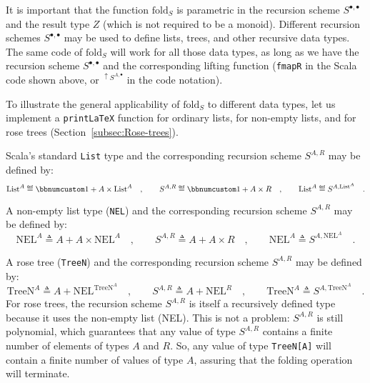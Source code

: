 It is important that the function $\text{fold}_{S}$ is parametric
in the recursion scheme $S^{\bullet,\bullet}$ and the result type
$Z$ (which is not required to be a monoid). Different recursion schemes
$S^{\bullet,\bullet}$ may be used to define lists, trees, and other
recursive data types. The same code of $\text{fold}_{S}$ will work
for all those data types, as long as we have the recursion scheme
$S^{\bullet,\bullet}$ and the corresponding lifting function (\lstinline!fmapR!
in the Scala code shown above, or $^{\uparrow S^{A,\bullet}}$ in
the code notation).

To illustrate the general applicability of $\text{fold}_{S}$ to different
data types, let us implement a \lstinline!printLaTeX! function for
ordinary lists, for non-empty lists, and for rose trees (Section~\ref{subsec:Rose-trees}).

Scala\textsf{'}s standard \lstinline!List! type and the corresponding recursion
scheme $S^{A,R}$ may be defined by:
\[
\text{List}^{A}\triangleq\bbnum 1+A\times\text{List}^{A}\quad,\quad\quad S^{A,R}\triangleq\bbnum 1+A\times R\quad,\quad\quad\text{List}^{A}\triangleq S^{A,\text{List}^{A}}\quad.
\]

A non-empty list type (\lstinline!NEL!) and the corresponding recursion
scheme $S^{A,R}$ may be defined by:
\[
\text{NEL}^{A}\triangleq A+A\times\text{NEL}^{A}\quad,\quad\quad S^{A,R}\triangleq A+A\times R\quad,\quad\quad\text{NEL}^{A}\triangleq S^{A,\text{NEL}^{A}}\quad.
\]

A rose tree (\lstinline!TreeN!) and the corresponding recursion scheme
$S^{A,R}$ may be defined by:
\[
\text{TreeN}^{A}\triangleq A+\text{NEL}^{\text{TreeN}^{A}}\quad,\quad\quad S^{A,R}\triangleq A+\text{NEL}^{R}\quad,\quad\quad\text{TreeN}^{A}\triangleq S^{A,\text{TreeN}^{A}}\quad.
\]
For rose trees, the recursion scheme $S^{A,R}$ is itself a recursively
defined type because it uses the non-empty list (NEL). This is not
a problem: $S^{A,R}$ is still polynomial, which guarantees that any
value of type $S^{A,R}$ contains a finite number of elements of types
$A$ and $R$. So, any value of type \lstinline!TreeN[A]! will contain
a finite number of values of type $A$, assuring that the folding
operation will terminate.

